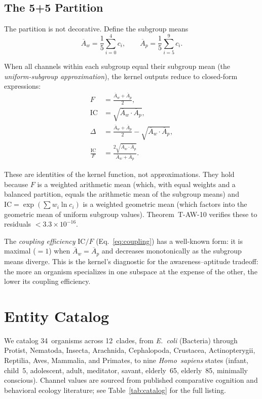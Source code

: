 \documentclass[
  aps,
  prd,
  twocolumn,
  superscriptaddress,
  nofootinbib,
  floatfix
]{revtex4-2}
\newcommand{\beq}{\begin{equation}}
\newcommand{\eeq}{\end{equation}}
\newcommand{\IC}{\mathrm{IC}}
\newcommand{\Aw}{\overline{A}_{\!w}}
\newcommand{\Ap}{\overline{A}_{\!p}}
\begin{document}
\subsection{The 5+5 Partition}

The partition is not decorative.  Define the subgroup means
\beq
  \Aw = \frac{1}{5}\sum_{i=0}^{4} c_i, \qquad
  \Ap = \frac{1}{5}\sum_{i=5}^{9} c_i.
\eeq

When all channels within each subgroup equal their subgroup
mean (the \emph{uniform-subgroup approximation}), the kernel
outputs reduce to closed-form expressions:
\begin{align}
  F &= \frac{\Aw + \Ap}{2}, \label{eq:F_exact}\\
  \IC &= \sqrt{\Aw \cdot \Ap}, \label{eq:IC_exact}\\
  \Delta &= \frac{\Aw + \Ap}{2} - \sqrt{\Aw \cdot \Ap},
  \label{eq:delta_exact}\\
  \frac{\IC}{F} &= \frac{2\sqrt{\Aw \cdot \Ap}}
    {\Aw + \Ap}. \label{eq:coupling}
\end{align}

These are identities of the kernel function, not
approximations.  They hold because $F$ is a weighted
arithmetic mean (which, with equal weights and a balanced
partition, equals the arithmetic mean of the subgroup
means) and $\IC = \exp(\sum w_i \ln c_i)$ is a weighted
geometric mean (which factors into the geometric mean of
uniform subgroup values).  Theorem~T-AW-10 verifies these
to residuals $< 3.3 \times 10^{-16}$.

The \emph{coupling efficiency} $\IC/F$ (Eq.~\ref{eq:coupling})
has a well-known form: it is maximal ($= 1$) when
$\Aw = \Ap$ and decreases monotonically as the subgroup
means diverge.  This is the kernel's diagnostic for the
awareness--aptitude tradeoff: the more an organism
specializes in one subspace at the expense of the other,
the lower its coupling efficiency.

\section{Entity Catalog}\label{sec:catalog}

We catalog 34~organisms across 12~clades, from
\emph{E.~coli} (Bacteria) through Protist, Nematoda,
Insecta, Arachnida, Cephalopoda, Crustacea, Actinopterygii,
Reptilia, Aves, Mammalia, and Primates, to nine
\emph{Homo~sapiens} states (infant, child~5, adolescent,
adult, meditator, savant, elderly~65, elderly~85, minimally
conscious).  Channel values are sourced from published
comparative cognition and behavioral ecology literature;
see Table~\ref{tab:catalog} for the full listing.
\end{document}

